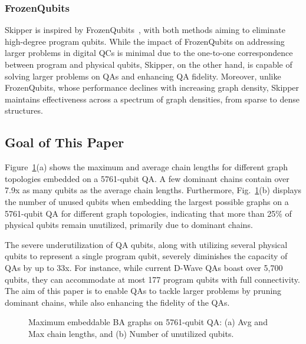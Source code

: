 \subsubsection{FrozenQubits}

Skipper is inspired by FrozenQubits~\cite{ayanzadeh2023frozenqubits}, with both methods aiming to eliminate high-degree program qubits. 
While the impact of FrozenQubits on addressing larger problems in digital QCs is minimal due to the one-to-one correspondence between program and physical qubits, 
Skipper, on the other hand, is capable of solving larger problems on QAs and enhancing QA fidelity. 
Moreover, unlike FrozenQubits, whose performance declines with increasing graph density, Skipper maintains effectiveness across a spectrum of graph densities, from sparse to dense structures.



\subsection{Goal of This Paper}

Figure~\ref{fig:observation}(a) shows the maximum and average chain lengths for different graph topologies embedded on a 5761-qubit QA. 
A few dominant chains contain over 7.9x as many qubits as the average chain lengths.
Furthermore, Fig.~\ref{fig:observation}(b) displays the number of unused qubits when embedding the largest possible graphs on a 5761-qubit QA for different graph topologies, 
indicating that more than 25\% of physical qubits remain unutilized, primarily due to dominant chains.

The severe underutilization of QA qubits, along with utilizing several physical qubits to represent a single program qubit, severely diminishes the capacity of QAs by up to 33x.
For instance, while current D-Wave QAs boast over 5,700 qubits, they can accommodate at most 177 program qubits with full connectivity.
The aim of this paper is to enable QAs to tackle larger problems by pruning dominant chains, while also enhancing the fidelity of the QAs.


\begin{figure}[h]
    \captionsetup[subfigure]{position=top} %
    \centering
    \caption{
Maximum embeddable BA graphs on 5761-qubit QA: (a) Avg and Max chain lengths, and (b) Number of unutilized qubits. }    
    \label{fig:observation}    
\end{figure}  

